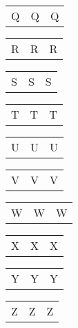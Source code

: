 \documentclass{minimal}
\begin{document}
\begin{longtable}{p{2.8cm}p{2.8cm}p{2.8cm}}
Q & Q & Q
\end{longtable}

\begin{longtable}{p{2.8cm}p{2.8cm}p{2.8cm}}
R & R & R
\end{longtable}

\begin{longtable}{p{2.8cm}p{2.8cm}p{2.8cm}}
S & S & S
\end{longtable}

\begin{longtable}{p{2.8cm}p{2.8cm}p{2.8cm}}
T & T & T
\end{longtable}

\begin{longtable}{p{2.8cm}p{2.8cm}p{2.8cm}}
U & U & U
\end{longtable}

\begin{longtable}{p{2.8cm}p{2.8cm}p{2.8cm}}
V & V & V
\end{longtable}

\begin{longtable}{p{2.8cm}p{2.8cm}p{2.8cm}}
W & W & W
\end{longtable}

\begin{longtable}{p{2.8cm}p{2.8cm}p{2.8cm}}
X & X & X
\end{longtable}

\begin{longtable}{p{2.8cm}p{2.8cm}p{2.8cm}}
Y & Y & Y
\end{longtable}

\begin{longtable}{p{2.8cm}p{2.8cm}p{2.8cm}}
Z & Z & Z
\end{longtable}
\end{document}
